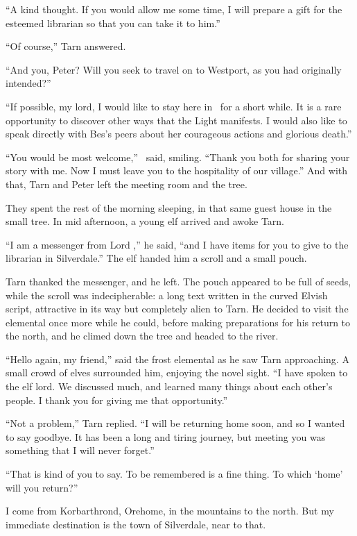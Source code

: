 ``A kind thought.  If you would allow me some time, I will prepare a gift for the esteemed librarian so that you can take it to him.''

``Of course,'' Tarn answered.

``And you, Peter?  Will you seek to travel on to Westport, as you had originally intended?''

``If possible, my lord, I would like to stay here in \inarthonor\ for a short while.  It is a rare opportunity to discover other ways that the Light manifests.  I would also like to speak directly with Bes's peers about her courageous actions and glorious death.''

``You would be most welcome,'' \arilor\ said, smiling.  ``Thank you both for sharing your story with me.  Now I must leave you to the hospitality of our village.''  And with that, Tarn and Peter left the meeting room and the tree.

They spent the rest of the morning sleeping, in that same guest house in the small tree.  In mid afternoon, a young elf arrived and awoke Tarn.

``I am a messenger from Lord \arilor,'' he said, ``and I have items for you to give to the librarian in Silverdale.''  The elf handed him a scroll and a small pouch.

Tarn thanked the messenger, and he left.  The pouch appeared to be full of seeds, while the scroll was indecipherable: a long text written in the curved Elvish script, attractive in its way but completely alien to Tarn.  He decided to visit the elemental once more while he could, before making preparations for his return to the north, and he climed down the tree and headed to the river.

``Hello again, my friend,'' said the frost elemental as he saw Tarn approaching.  A small crowd of elves surrounded him, enjoying the novel sight.  ``I have spoken to the elf lord.  We discussed much, and learned many things about each other's people.  I thank you for giving me that opportunity.''

``Not a problem,'' Tarn replied.  ``I will be returning home soon, and so I wanted to say goodbye.  It has been a long and tiring journey, but meeting you was something that I will never forget.''

``That is kind of you to say.  To be remembered is a fine thing.  To which `home' will you return?''

I come from Korbarthrond, Orehome, in the mountains to the north.  But my immediate destination is the town of Silverdale, near to that.

